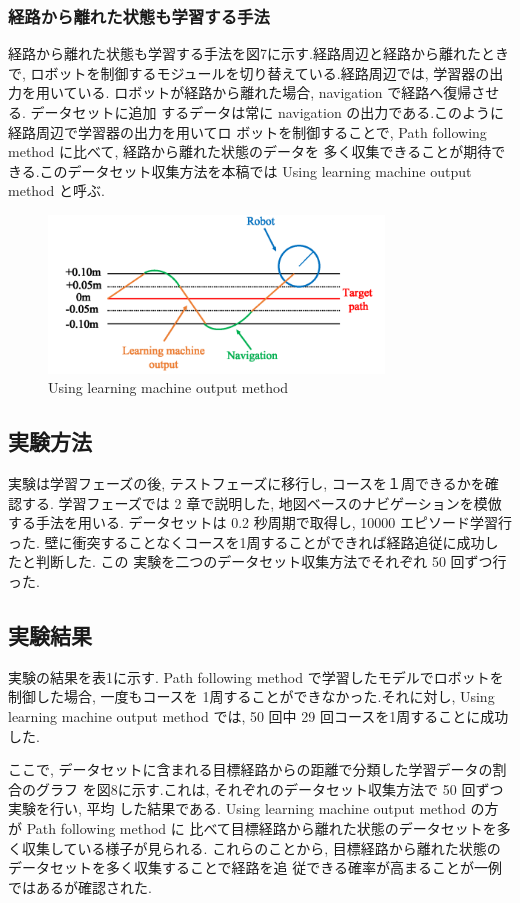 \documentclass{jarticle}
\begin{document}
\subsubsection{経路から離れた状態も学習する手法}
経路から離れた状態も学習する手法を図7に示す.経路周辺と経路から離れたときで, 
ロボットを制御するモジュールを切り替えている.経路周辺では, 学習器の出力を用いている.
ロボットが経路から離れた場合,  navigation で経路へ復帰させる. データセットに追加
するデータは常に navigation の出力である.このように経路周辺で学習器の出力を用いてロ
ボットを制御することで,  Path following method に比べて, 経路から離れた状態のデータを
多く収集できることが期待できる.このデータセット収集方法を本稿では Using learning
machine output method と呼ぶ.

\begin{figure}[h!]
  \centering
   \includegraphics[height=42mm]{./figs/dl_use.png}
   \caption{Using learning machine output method}
\end{figure}

\subsection{実験方法}
実験は学習フェーズの後, テストフェーズに移行し, コースを１周できるかを確認する.
学習フェーズでは 2 章で説明した, 地図ベースのナビゲーションを模倣する手法を用いる.
データセットは 0.2 秒周期で取得し,  10000 エピソード学習行った.
壁に衝突することなくコースを1周することができれば経路追従に成功したと判断した. この
実験を二つのデータセット収集方法でそれぞれ 50 回ずつ行った.

\subsection{実験結果}
実験の結果を表1に示す. Path following method で学習したモデルでロボットを
制御した場合, 一度もコースを 1周することができなかった.それに対し, Using learning
machine output method では,  50 回中 29 回コースを1周することに成功した.

ここで, データセットに含まれる目標経路からの距離で分類した学習データの割合のグラフ
を図8に示す.これは, それぞれのデータセット収集方法で 50 回ずつ実験を行い, 平均
した結果である. Using learning machine output method の方が Path following method に
比べて目標経路から離れた状態のデータセットを多く収集している様子が見られる.
これらのことから, 目標経路から離れた状態のデータセットを多く収集することで経路を追
従できる確率が高まることが一例ではあるが確認された.
\end{document}
